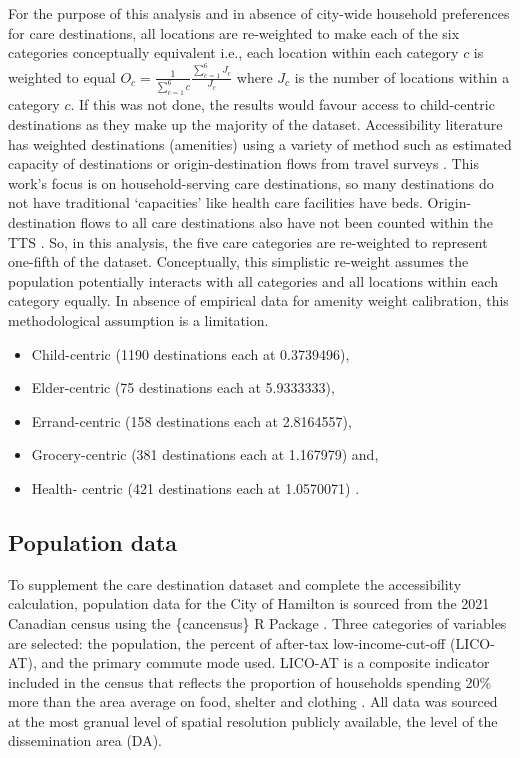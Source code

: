 \documentclass[
  authoryear,
  preprint,
  3p]{elsarticle}
\providecommand{\tightlist}{%
  \setlength{\itemsep}{0pt}\setlength{\parskip}{0pt}}\usepackage{longtable,booktabs,array}
\def\tightlist{}
\begin{document}
For the purpose of this analysis and in absence of city-wide household
preferences for care destinations, all locations are re-weighted to make
each of the six categories conceptually equivalent i.e., each location
within each category \(c\) is weighted to equal
\(O_c = \frac{1}{\sum_{c=1}^{6} c}\frac{\sum_{c=1}^{6} J_c}{J_c}\) where
\(J_c\) is the number of locations within a category \(c\). If this was
not done, the results would favour access to child-centric destinations
as they make up the majority of the dataset. Accessibility literature
has weighted destinations (amenities) using a variety of method such as
estimated capacity of destinations
\citep{liMeasuringMultiactivities2024} or origin-destination flows from
travel surveys
\citep{graellsCityCitiesMeasuring2021, chengInvestigatingWalkingAccessibility2019}.
This work's focus is on household-serving care destinations, so many
destinations do not have traditional `capacities' like health care
facilities have beds. Origin-destination flows to all care destinations
also have not been counted within the TTS
\citep{transportationtomorrowsurvey2018}. So, in this analysis, the five
care categories are re-weighted to represent one-fifth of the dataset.
Conceptually, this simplistic re-weight assumes the population
potentially interacts with all categories and all locations within each
category equally. In absence of empirical data for amenity weight
calibration, this methodological assumption is a limitation.

\begin{itemize}
\tightlist
\item
  Child-centric (1190 destinations each at 0.3739496),
\item
  Elder-centric (75 destinations each at 5.9333333),
\item
  Errand-centric (158 destinations each at 2.8164557),
\item
  Grocery-centric (381 destinations each at 1.167979) and,
\item
  Health- centric (421 destinations each at 1.0570071) .
\end{itemize}

\hypertarget{population-data}{%
\subsection{Population data}\label{population-data}}

To supplement the care destination dataset and complete the
accessibility calculation, population data for the City of Hamilton is
sourced from the 2021 Canadian census using the \{cancensus\} R Package
\citep{governmentofcanadaCensusPopulation2023, vonbergmannCancensusCensusMapper2021}.
Three categories of variables are selected: the population, the percent
of after-tax low-income-cut-off (LICO-AT), and the primary commute mode
used. LICO-AT is a composite indicator included in the census that
reflects the proportion of households spending 20\% more than the area
average on food, shelter and clothing
\citep{governmentofcanadaLowIncomeCutoffs2023}. All data was sourced at
the most granual level of spatial resolution publicly available, the
level of the dissemination area (DA).
\end{document}
